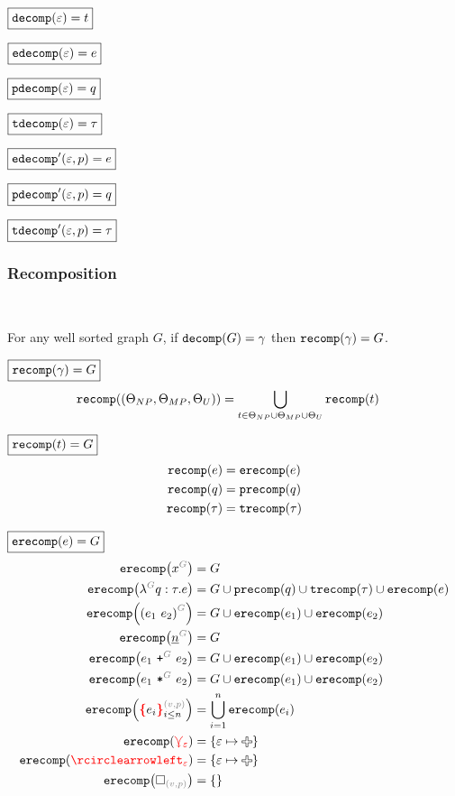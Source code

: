 \noindent $\boxed{\decomp{\e} = t}$
%
\figureDecompositionDefDecompTerm

\noindent $\boxed{\edecomp{\e} = e}$
%
\figureDecompositionDefEdecomp

\noindent $\boxed{\pdecomp{\e} = q}$
%
\figureDecompositionDefPdecomp

\noindent $\boxed{\tdecomp{\e} = \tau}$
%
\figureDecompositionDefTdecomp

\noindent $\boxed{\edecompPrime{\e}{p} = e}$
%
\figureDecompositionDefEdecompPrime

\noindent $\boxed{\pdecompPrime{\e}{p} = q}$
%
\figureDecompositionDefPdecompPrime

\noindent $\boxed{\tdecompPrime{\e}{p} = \tau}$
%
\figureDecompositionDefTdecompPrime%


\subsubsection{Recomposition}\hspace*{\fill} \\

\begin{theorem}
  For any well sorted graph $G$,
  if $\decomp{G} = \Grove$ then $\recomp{\Grove} = G$.
\end{theorem}

\noindent $\boxed{\recomp{\Grove} = G}$
%
\begin{align*}
  \recomp{(\Set[NP], \Set[MP], \Set[U])} &= \bigcup_{t \in \Set[NP] \cup \Set[MP] \cup \Set[U]} \recomp{t}
\end{align*}

\noindent $\boxed{\recomp{t} = G}$
%
\begin{align*}
  \recomp{e} &= \erecomp{e} \\
  \recomp{q} &= \precomp{q} \\
  \recomp{\tau} &= \trecomp{\tau}
\end{align*}

\noindent $\boxed{\erecomp{e} = G}$
%
\begin{align*}
  \erecomp{\eVar{G}{x}} &= G
  \\
  \erecomp{\eFun{G}{q}{\tau}{e}}
    &= G \cup \precomp{q} \cup \trecomp{\tau} \cup \erecomp{e}
  \\
  \erecomp{\eApp{G}{e_1}{e_2}}
    &= G \cup \erecomp{e_1} \cup \erecomp{e_2}
  \\
  \erecomp{\eNum{G}{n}} &= G
  \\
  \erecomp{\ePlus{G}{e_1}{e_2}}
    &= G \cup \erecomp{e_1} \cup \erecomp{e_2}
  \\
  \erecomp{\eTimes{G}{e_1}{e_2}}
    &= G \cup \erecomp{e_1} \cup \erecomp{e_2}
  \\
  \erecomp{\conflictHole[i \leq n]{e_i}{v}{p}}
  &= \bigcup_{i=1}^n \erecomp{e_i}
  \\
  \erecomp{\multiVertex{\e}} &= \SetOf{\e \mapsto \Plus}
  \\
  \erecomp{\cycleVertex{\e}} &= \SetOf{\e \mapsto \Plus}
  \\
  \erecomp{\emptyHole{v}{p}} &= \SetOf{}
\end{align*}

